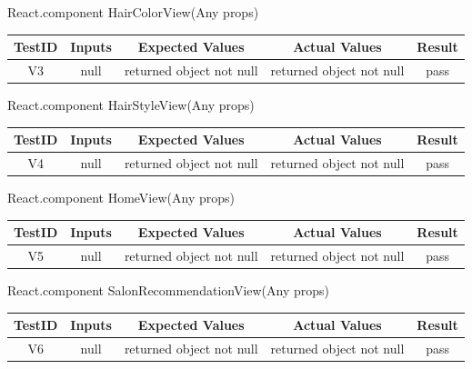 \documentclass[12pt, titlepage]{article}
\begin{document}
React.component HairColorView(Any props) \\
\begin{tabular}{ |c|c|c|c|c| } 
 \hline
 TestID & Inputs & Expected Values & Actual Values & Result \\ 
 \hline
 V3 & null & returned object not null & returned object not null & pass \\ 
 \hline
\end{tabular}

React.component HairStyleView(Any props) \\
\begin{tabular}{ |c|c|c|c|c| } 
 \hline
 TestID & Inputs & Expected Values & Actual Values & Result \\ 
 \hline
 V4 & null & returned object not null & returned object not null & pass \\ 
 \hline
\end{tabular}

React.component HomeView(Any props) \\
\begin{tabular}{ |c|c|c|c|c| } 
 \hline
 TestID & Inputs & Expected Values & Actual Values & Result \\ 
 \hline
 V5 & null & returned object not null & returned object not null & pass \\ 
 \hline
\end{tabular}

React.component SalonRecommendationView(Any props) \\
\begin{tabular}{ |c|c|c|c|c| } 
 \hline
 TestID & Inputs & Expected Values & Actual Values & Result \\ 
 \hline
 V6 & null & returned object not null & returned object not null & pass \\ 
 \hline
\end{tabular}
\end{document}
